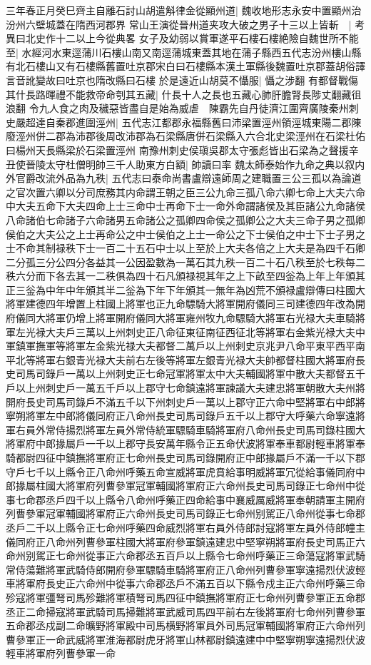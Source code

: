 三年春正月癸巳齊主自離石討山胡遣斛律金從顯州道|{
	魏收地形志永安中置顯州治汾州六壁城蓋在隋西河郡界}
常山王演從晉州道夹攻大破之男子十三以上皆斬　|{
	考異曰北史作十二以上今從典畧}
女子及幼弱以賞軍遂平石樓石樓絶險自魏世所不能至|{
	水經河水東逕蒲川石樓山南又南逕蒲城東蓋其地在蒲子縣西五代志汾州樓山縣有北石樓山又有石樓縣舊置吐京郡宋白曰石樓縣本漢土軍縣後魏置吐京郡蓋胡俗譯言音訛變故曰吐京也隋改縣曰石樓}
於是遠近山胡莫不懾服|{
	懾之涉翻}
有都督戰傷其什長路暉禮不能救帝命刳其五藏|{
	什長十人之長也五藏心肺肝膽腎長陟丈翻藏徂浪翻}
令九人食之肉及穢惡皆盡自是始為威虐　陳霸先自丹徒濟江圍齊廣陵秦州刺史嚴超達自秦郡進圍涇州|{
	五代志江都郡永福縣舊曰沛梁置涇州領涇城東陽二郡陳廢涇州併二郡為沛郡後周改沛郡為石梁縣唐併石梁縣入六合北史梁涇州在石梁杜佑曰楊州天長縣梁於石梁置涇州}
南豫州刺史侯瑱吳郡太守張彪皆出石梁為之聲援辛丑使晉陵太守杜僧明帥三千人助東方白額|{
	帥讀曰率}
魏太師泰始作九命之典以叙内外官爵改流外品為九秩|{
	五代志曰泰命尚書盧辯遠師周之建職置三公三孤以為論道之官次置六卿以分司庶務其内命謂王朝之臣三公九命三孤八命六卿七命上大夫六命中大夫五命下大夫四命上士三命中士再命下士一命外命謂諸侯及其臣諸公九命諸侯八命諸伯七命諸子六命諸男五命諸公之孤卿四命侯之孤卿公之大夫三命子男之孤卿侯伯之大夫公之上士再命公之中士侯伯之上士一命公之下士侯伯之中士下士子男之士不命其制禄秩下士一百二十五石中士以上至於上大夫各倍之上大夫是為四千石卿二分孤三分公四分各益其一公因盈數為一萬石其九秩一百二十石八秩至於七秩每二秩六分而下各去其一二秩俱為四十石凡頒禄視其年之上下畝至四釡為上年上年頒其正三釡為中年中年頒其半二釡為下年下年頒其一無年為凶荒不頒禄盧辯傳曰柱國大將軍建德四年增置上柱國上將軍也正九命驃騎大將軍開府儀同三司建德四年改為開府儀同大將軍仍增上將軍開府儀同大將軍雍州牧九命驃騎大將軍右光禄大夫車騎將軍左光禄大夫戶三萬以上州刺史正八命征東征南征西征北等將軍右金紫光禄大夫中軍鎮軍撫軍等將軍左金紫光禄大夫都督二萬戶以上州刺史京兆尹八命平東平西平南平北等將軍右銀青光禄大夫前右左後等將軍左銀青光禄大夫帥都督柱國大將軍府長史司馬司錄戶一萬以上州刺史正七命冠軍將軍太中大夫輔國將軍中散大夫都督五千戶以上州刺史戶一萬五千戶以上郡守七命鎮遠將軍諫議大夫建忠將軍朝散大夫州將開府長史司馬司錄戶不滿五千以下州刺史戶一萬以上郡守正六命中堅將軍右中郎將寧朔將軍左中郎將儀同府正八命州長史司馬司錄戶五千以上郡守大呼藥六命寧遠將軍右員外常侍揚烈將軍左員外常侍統軍驃騎車騎將軍府八命州長史司馬司錄柱國大將軍府中郎掾屬戶一千以上郡守長安萬年縣令正五命伏波將軍奉車都尉輕車將軍奉騎都尉四征中鎮撫將軍府正七命州長史司馬司錄開府正中郎掾屬戶不滿一千以下郡守戶七千以上縣令正八命州呼藥五命宣威將軍虎賁給事明威將軍冗從給事儀同府中郎掾屬柱國大將軍府列曹參軍冠軍輔國將軍府正六命州長史司馬司錄正七命州中從事七命郡丞戶四千以上縣令八命州呼藥正四命給事中襄威厲威將軍奉朝請軍主開府列曹參軍冠軍輔國將軍府正六命州長史司馬司錄正七命州别駕正八命州從事七命郡丞戶二千以上縣令正七命州呼藥四命威烈將軍右員外侍郎討寇將軍左員外侍郎幢主儀同府正八命州列曹參軍柱國大將軍府參軍鎮遠建忠中堅寧朔將軍府長史司馬正六命州别駕正七命州從事正六命郡丞五百戶以上縣令七命州呼藥正三命蕩寇將軍武騎常侍蕩難將軍武騎侍郎開府參軍驃騎車騎將軍府正八命州列曹參軍寧遠揚烈伏波輕車將軍府長史正六命州中從事六命郡丞戶不滿五百以下縣令戍主正六命州呼藥三命殄寇將軍彊弩司馬殄難將軍積弩司馬四征中鎮撫將軍府正七命州列曹參軍正五命郡丞正二命掃寇將軍武騎司馬掃難將軍武威司馬四平前右左後將軍府七命州列曹參軍五命郡丞戍副二命曠野將軍殿中司馬横野將軍員外司馬冠軍輔國將軍府正六命州列曹參軍正一命武威將軍淮海都尉虎牙將軍山林都尉鎮遠建中中堅寧朔寧遠揚烈伏波輕車將軍府列曹參軍一命}
